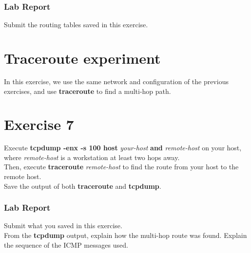\documentclass[10pt,a4paper]{article}
\numberwithin{equation}{section}
\numberwithin{figure}{section}
\numberwithin{table}{section}
\begin{document}
    \subsubsection*{Lab Report}
    Submit the routing tables saved in this exercise.


    \section*{Traceroute experiment}
    In this exercise, we use the same network and configuration of the previous exercises, and use \textbf{traceroute} to find a multi-hop path.

    \section{Exercise 7}
    Execute \textbf{tcpdump -enx -s 100 host} \textit{your-host} \textbf{and} \textit{remote-host} on your host, where \textit{remote-host} is a workstation at least two hops away. \\
    Then, execute \textbf{traceroute} \textit{remote-host} to find the route from your host to the remote host. \\
    Save the output of both \textbf{traceroute} and \textbf{tcpdump}.

    \subsubsection*{Lab Report}
    Submit what you saved in this exercise. \\
    From the \textbf{tcpdump} output, explain how the multi-hop route was found.
    Explain the sequence of the ICMP messages used.
\end{document}
